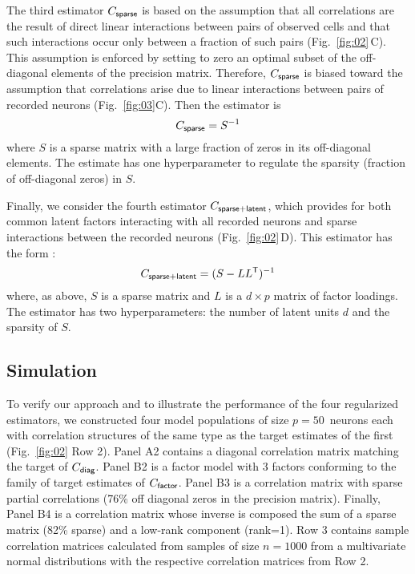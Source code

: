 \documentclass[10pt]{article}
\newcommand{\T}{{\sf T}}
\begin{document}
The third estimator $C_{\sf sparse}$ is based on the assumption that all correlations are the result of direct linear interactions between pairs of observed cells and that such interactions occur only between a fraction of such pairs (Fig.~\ref{fig:02}\,C).  This assumption is enforced by setting to zero an optimal subset of the off-diagonal elements of the precision matrix.  Therefore, $C_{\sf sparse}$ is biased toward the assumption that correlations arise due to linear interactions between pairs of recorded neurons (Fig.~\ref{fig:03}C). Then the estimator is 
\begin{equation}
C_{\sf sparse} = S^{-1}
\end{equation}
where $S$ is a sparse matrix with a large fraction of zeros in its off-diagonal elements. The estimate has one hyperparameter to regulate the sparsity (fraction of off-diagonal zeros) in $S$.

Finally, we consider the fourth estimator $C_{\sf sparse+latent}$, which provides for both common latent factors interacting with all recorded neurons and sparse interactions between the recorded neurons (Fig.~\ref{fig:02}\,D). This estimator has the form \cite{Chandrasekaran:2010,Ma:2013}:
\begin{equation}
C_{\sf sparse+latent} = (S - LL^\T)^{-1}
\end{equation}
where, as above, $S$ is a sparse matrix and $L$ is a $d\times p$ matrix of factor loadings. The estimator has two hyperparameters: the number of latent units $d$ and the sparsity of $S$.

\subsection*{Simulation}
To verify our approach and to illustrate the performance of the four regularized estimators, we constructed four model populations of size $p=50$~neurons each with correlation structures of the same type as the target estimates of the first (Fig.~\ref{fig:02} Row 2). Panel A2 contains a diagonal correlation matrix matching the target of $C_{\sf diag}$. Panel B2 is a factor model with 3 factors conforming to the family of target estimates of $C_{\sf factor}$. Panel B3 is a correlation matrix with sparse partial correlations (76\% off diagonal zeros in the precision matrix). Finally, Panel B4 is a correlation matrix whose inverse is composed the sum of a sparse matrix (82\% sparse) and a low-rank component (rank=1).
Row 3 contains sample correlation matrices calculated from samples of size $n=1000$ from a multivariate normal distributions with the respective correlation matrices from Row 2.
\end{document}
